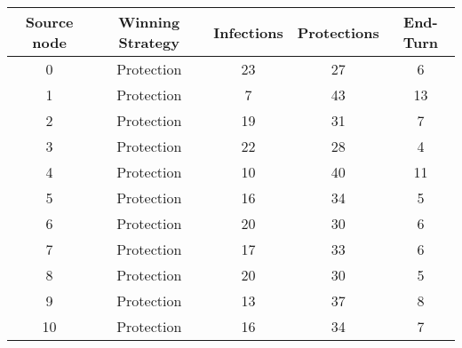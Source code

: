 \documentclass[results.tex]{subfiles}
\begin{document}
    \begin{center}
        \begin{tabular}{| c || c | c | c | c |}
            \hline
            {\bfseries Source node} & {\bfseries Winning Strategy} & {\bfseries Infections} & {\bfseries Protections}
            & {\bfseries End-Turn}
            \\  %
            \hline\hline
            0                       & Protection                   & 23                     & 27                      & 6                    \\
            \hline
            1                       & Protection                   & 7                      & 43                      & 13                   \\
            \hline
            2                       & Protection                   & 19                     & 31                      & 7                    \\
            \hline
            3                       & Protection                   & 22                     & 28                      & 4                    \\
            \hline
            4                       & Protection                   & 10                     & 40                      & 11                   \\
            \hline
            5                       & Protection                   & 16                     & 34                      & 5                    \\
            \hline
            6                       & Protection                   & 20                     & 30                      & 6                    \\
            \hline
            7                       & Protection                   & 17                     & 33                      & 6                    \\
            \hline
            8                       & Protection                   & 20                     & 30                      & 5                    \\
            \hline
            9                       & Protection                   & 13                     & 37                      & 8                    \\
            \hline
            10                      & Protection                   & 16                     & 34                      & 7                    \\

\end{tabular}
\end{center}
\end{document}
